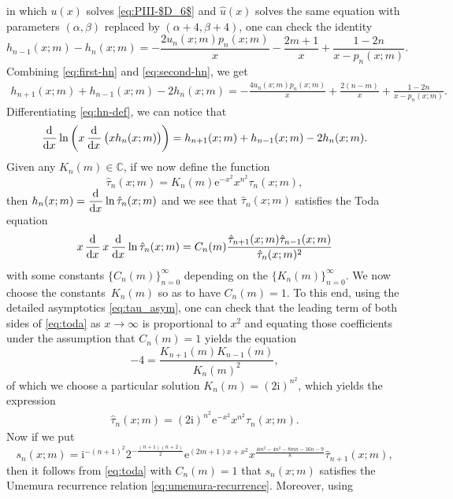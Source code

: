 \documentclass[pdftex]{sigma}
\numberwithin{equation}{section}
\newcommand{\ee}{\mathrm{e}}
\newcommand{\ii}{\mathrm{i}}
\newcommand{\C}{{\mathbb{C}}}
\begin{document}
in which $u(x)$ solves \eqref{eq:PIII-$D_6$} and $\hat{u}(x)$ solves the same equation with parameters $(\alpha,\beta)$ replaced by $(\alpha+4,\beta+4)$, one can check the identity
 \begin{equation} \label{eq:second-hn}
h_{n-1}(x;m)-h_n(x;m)=
-\frac{2u_n(x;m)p_n(x;m)}{x}-\frac{2m+1}{x}+\frac{1-2n}{x-p_n(x;m)}.
 \end{equation}
 Combining \eqref{eq:first-hn} and \eqref{eq:second-hn}, we get
 \begin{gather*}
h_{n+1}(x;m)+h_{n-1}(x;m)-2h_{n}(x;m)=
-\frac{4u_n(x;m)p_n(x;m)}{x}+\frac{2(n-m)}{x}+\frac{1-2n}{x\!-\!p_n(x;m)}.
 \end{gather*}
Differentiating \eqref{eq:hn-def}, we can notice that
\begin{equation*} \dod{}{x}\ln\left(x \dod{}{x}\left( xh_n(x;m)\right)\right)={h_{n+1}(x;m)+h_{n-1}(x;m)-2h_n(x;m)}. \end{equation*}
Given any $K_n(m) \in \C$, if we now define the function
\begin{equation*}\hat{\tau}_n(x;m)= K_n(m)\ee^{-x^2}x^{n^2}{\tau}_n(x;m), \end{equation*}
then $h_n(x;m)=\dod{}{x}\ln \hat{\tau}_n(x;m)$ and we see that
$\hat{\tau}_n(x;m)$ satisfies the Toda equation
 \begin{equation}\label{eq:toda}
 x \dod{}{x} x\dod{}{x}\ln\hat{\tau}_n(x;m)=C_n(m)\frac{\hat{\tau}_{n+1}(x;m)\hat{\tau}_{n-1}(x;m)}{\hat{\tau}_n(x;m)^2} \end{equation}
 with some constants $\{C_n(m)\}_{n=0}^\infty$ depending on the $\{K_n(m)\}_{n=0}^\infty$. We now choose the constants~$K_n(m)$ so as to have $C_n(m) = 1$. To this end, using the detailed asymptotics \eqref{eq:tau_asym}, one can check that the leading term of both sides of \eqref{eq:toda} as $x\to\infty$ is proportional to $x^2$ and equating those coefficients under the assumption that $C_n(m)=1$ yields the equation
 \[
 -4 = \dfrac{K_{n + 1}(m)K_{n-1}(m)}{K_n(m)^2},
 \]
 of which we choose a particular solution $K_n(m) = (2\ii)^{n^2}$, which yields the expression
 \begin{gather}
 \hat{\tau}_n(x;m)= (2\ii)^{n^2}\ee^{-x^2}x^{n^2}{\tau}_n(x;m).
 \label{eq:hattau-tau}
 \end{gather}
 Now if we put
\[
s_n(x;m)=\ii^{-{(n+1)^2}{}}2^{-\frac{(n+1)(n+2)}{2}} \ee^{(2 m+1)x+x^2} x^{\frac{4m^2-4n^2-8mn-16n-9}{8}}\hat{\tau}_{n+1}(x;m),
\]
then it follows from \eqref{eq:toda} with $C_n(m)=1$ that $s_n(x;m)$ satisfies the Umemura recurrence relation \eqref{eq:umemura-recurrence}. Moreover, using
\end{document}
